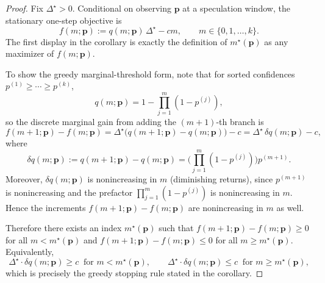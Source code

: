 \begin{proof}
Fix $\Delta^\star>0$. Conditional on observing $\mathbf p$ at a speculation window, the stationary one-step objective is
\[
f(m;\mathbf p) := q(m;\mathbf p)\,\Delta^\star - c m,
\qquad m\in\{0,1,\dots,k\}.
\]
The first display in the corollary is exactly the definition of $m^\star(\mathbf p)$ as any maximizer of $f(m;\mathbf p)$.

To show the greedy marginal-threshold form, note that for sorted confidences
$p^{(1)}\ge\cdots\ge p^{(k)}$,
\[
q(m;\mathbf p)=1-\prod_{j=1}^{m}(1-p^{(j)}),
\]
so the discrete marginal gain from adding the $(m+1)$-th branch is
\[
f(m+1;\mathbf p)-f(m;\mathbf p)
=\Delta^\star\bigl(q(m+1;\mathbf p)-q(m;\mathbf p)\bigr)-c
=\Delta^\star\,\delta q(m;\mathbf p)-c,
\]
where
\[
\delta q(m;\mathbf p)
:=q(m+1;\mathbf p)-q(m;\mathbf p)
=\Big(\prod_{j=1}^{m}(1-p^{(j)})\Big)p^{(m+1)}.
\]
Moreover, $\delta q(m;\mathbf p)$ is nonincreasing in $m$ (diminishing returns), since
$p^{(m+1)}$ is nonincreasing and the prefactor $\prod_{j=1}^{m}(1-p^{(j)})$ is nonincreasing in $m$.
Hence the increments $f(m+1;\mathbf p)-f(m;\mathbf p)$ are nonincreasing in $m$ as well.

Therefore there exists an index $m^\star(\mathbf p)$ such that
$f(m+1;\mathbf p)-f(m;\mathbf p)\ge 0$ for all $m<m^\star(\mathbf p)$ and
$f(m+1;\mathbf p)-f(m;\mathbf p)\le 0$ for all $m\ge m^\star(\mathbf p)$.
Equivalently,
\[
\Delta^\star \cdot \delta q(m;\mathbf p)\ge c \;\;\text{for } m<m^\star(\mathbf p),
\qquad
\Delta^\star \cdot \delta q(m;\mathbf p)\le c \;\;\text{for } m\ge m^\star(\mathbf p),
\]
which is precisely the greedy stopping rule stated in the corollary.
\end{proof}





